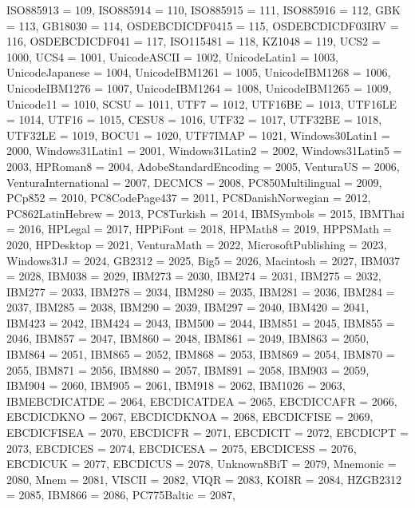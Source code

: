 \begin{codeblock}
{{    ISO885913 = 109,
    ISO885914 = 110,
    ISO885915 = 111,
    ISO885916 = 112,
    GBK = 113,
    GB18030 = 114,
    OSDEBCDICDF0415 = 115,
    OSDEBCDICDF03IRV = 116,
    OSDEBCDICDF041 = 117,
    ISO115481 = 118,
    KZ1048 = 119,
    UCS2 = 1000,
    UCS4 = 1001,
    UnicodeASCII = 1002,
    UnicodeLatin1 = 1003,
    UnicodeJapanese = 1004,
    UnicodeIBM1261 = 1005,
    UnicodeIBM1268 = 1006,
    UnicodeIBM1276 = 1007,
    UnicodeIBM1264 = 1008,
    UnicodeIBM1265 = 1009,
    Unicode11 = 1010,
    SCSU = 1011,
    UTF7 = 1012,
    UTF16BE = 1013,
    UTF16LE = 1014,
    UTF16 = 1015,
    CESU8 = 1016,
    UTF32 = 1017,
    UTF32BE = 1018,
    UTF32LE = 1019,
    BOCU1 = 1020,
    UTF7IMAP = 1021,
    Windows30Latin1 = 2000,
    Windows31Latin1 = 2001,
    Windows31Latin2 = 2002,
    Windows31Latin5 = 2003,
    HPRoman8 = 2004,
    AdobeStandardEncoding = 2005,
    VenturaUS = 2006,
    VenturaInternational = 2007,
    DECMCS = 2008,
    PC850Multilingual = 2009,
    PCp852 = 2010,
    PC8CodePage437 = 2011,
    PC8DanishNorwegian = 2012,
    PC862LatinHebrew = 2013,
    PC8Turkish = 2014,
    IBMSymbols = 2015,
    IBMThai = 2016,
    HPLegal = 2017,
    HPPiFont = 2018,
    HPMath8 = 2019,
    HPPSMath = 2020,
    HPDesktop = 2021,
    VenturaMath = 2022,
    MicrosoftPublishing = 2023,
    Windows31J = 2024,
    GB2312 = 2025,
    Big5 = 2026,
    Macintosh = 2027,
    IBM037 = 2028,
    IBM038 = 2029,
    IBM273 = 2030,
    IBM274 = 2031,
    IBM275 = 2032,
    IBM277 = 2033,
    IBM278 = 2034,
    IBM280 = 2035,
    IBM281 = 2036,
    IBM284 = 2037,
    IBM285 = 2038,
    IBM290 = 2039,
    IBM297 = 2040,
    IBM420 = 2041,
    IBM423 = 2042,
    IBM424 = 2043,
    IBM500 = 2044,
    IBM851 = 2045,
    IBM855 = 2046,
    IBM857 = 2047,
    IBM860 = 2048,
    IBM861 = 2049,
    IBM863 = 2050,
    IBM864 = 2051,
    IBM865 = 2052,
    IBM868 = 2053,
    IBM869 = 2054,
    IBM870 = 2055,
    IBM871 = 2056,
    IBM880 = 2057,
    IBM891 = 2058,
    IBM903 = 2059,
    IBM904 = 2060,
    IBM905 = 2061,
    IBM918 = 2062,
    IBM1026 = 2063,
    IBMEBCDICATDE = 2064,
    EBCDICATDEA = 2065,
    EBCDICCAFR = 2066,
    EBCDICDKNO = 2067,
    EBCDICDKNOA = 2068,
    EBCDICFISE = 2069,
    EBCDICFISEA = 2070,
    EBCDICFR = 2071,
    EBCDICIT = 2072,
    EBCDICPT = 2073,
    EBCDICES = 2074,
    EBCDICESA = 2075,
    EBCDICESS = 2076,
    EBCDICUK = 2077,
    EBCDICUS = 2078,
    Unknown8BiT = 2079,
    Mnemonic = 2080,
    Mnem = 2081,
    VISCII = 2082,
    VIQR = 2083,
    KOI8R = 2084,
    HZGB2312 = 2085,
    IBM866 = 2086,
    PC775Baltic = 2087,
}}
\end{codeblock}
